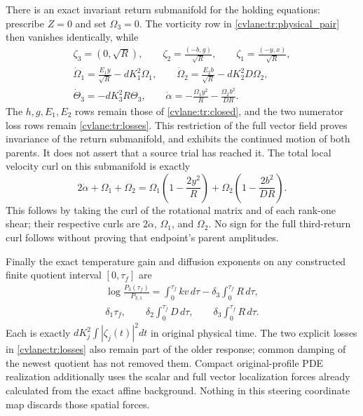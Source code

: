 There is an exact invariant return submanifold for the holding
equations: prescribe $Z=0$ and set $\Omega_3=0$. The vorticity
row in \eqref{cvlane:tr:physical_pair} then vanishes identically, while
\begin{equation}\label{cvlane:tr:hold}
 \begin{gathered}
 \zeta_3=(0,\sqrt R),\qquad
 \zeta_2=\frac{(-b,g)}{\sqrt R},\qquad
 \zeta_1=\frac{(-y,x)}{\sqrt R},\\
 \dot\Omega_1=\frac{E_1y}{\sqrt R}-dK_1^2\Omega_1,\qquad
 \dot\Omega_2=\frac{E_2b}{\sqrt R}-dK_2^2D\Omega_2,\\
 \dot\Theta_3=-dK_3^2R\Theta_3,\qquad
 \dot\alpha=-\frac{\Omega_1y^2}{R}
                 -\frac{\Omega_2b^2}{DR}.
 \end{gathered}
\end{equation}
The $h,g,E_1,E_2$ rows remain those of \eqref{cvlane:tr:closed}, and
the two numerator loss rows remain \eqref{cvlane:tr:losses}. This
restriction of the full vector field proves invariance of the
return submanifold, and exhibits the continued motion of both
parents. It does not assert that a source trial has reached it.
The total local velocity curl on this submanifold is exactly
\begin{equation}\label{cvlane:tr:origin_curl}
 2\dot\alpha+\Omega_1+\Omega_2
 =\Omega_1\left(1-\frac{2y^2}{R}\right)
  +\Omega_2\left(1-\frac{2b^2}{DR}\right).
\end{equation}
This follows by taking the curl of the rotational matrix and of
each rank-one shear; their respective curls are $2\dot\alpha$,
$\Omega_1$, and $\Omega_2$. No sign for the full third-return
curl follows without proving that endpoint's parent amplitudes.

Finally the exact temperature gain and diffusion exponents on any
constructed finite quotient interval $[0,\tau_f]$ are
\begin{equation}\label{cvlane:tr:costs}
 \begin{gathered}
 \log\frac{P_3(\tau_f)}{P_{3,1}}
 =\int_0^{\tau_f}kv\,d\tau
          -\delta_3\int_0^{\tau_f}R\,d\tau,\\
 \delta_1\tau_f,\qquad
 \delta_2\int_0^{\tau_f}D\,d\tau,\qquad
 \delta_3\int_0^{\tau_f}R\,d\tau.
 \end{gathered}
\end{equation}
Each is exactly $dK_j^2\int|\zeta_j(t)|^2dt$ in original
physical time. The two explicit losses in \eqref{cvlane:tr:losses}
also remain part of the older response; common damping of the
newest quotient has not removed them. Compact original-profile
PDE realization additionally uses the scalar and full vector
localization forces already calculated from the exact affine
background. Nothing in this steering coordinate map discards
those spatial forces.


